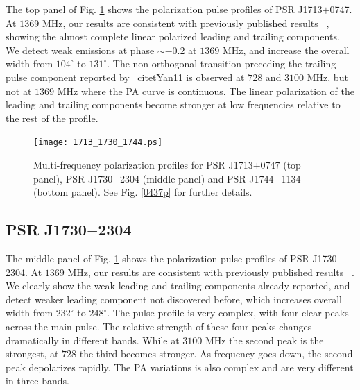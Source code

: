 \documentclass[useAMS,usenatbib]{mn2e}
\begin{document}
The top panel of Fig. \ref{1713p} shows the polarization pulse profiles of 
PSR J1713$+$0747. 
%
At $1369$ MHz, our results are consistent with previously published results
~\citep{Ord04,Yan11}, showing the almost complete linear polarized leading and 
trailing components.
%
We detect weak emissions at phase $\sim-0.2$ at $1369$ MHz, and increase the 
overall width from $104^{\circ}$ to $131^{\circ}$. 
%
The non-orthogonal transition preceding the trailing pulse component reported 
by ~citet{Yan11} is observed at $728$ and $3100$ MHz, but not at $1369$ MHz 
where the PA curve is continuous.
%
The linear polarization of the leading and trailing components become stronger 
at low frequencies relative to the rest of the profile.


\begin{figure}
\begin{center}
\texttt{[image: 1713\_1730\_1744.ps]}
\caption{Multi-frequency polarization profiles for PSR J1713$+$0747 (top 
panel), PSR J1730$-$2304 (middle panel) and PSR J1744$-$1134 (bottom panel). 
See Fig. \ref{0437p} for further details.}
\label{1713p}
\end{center}
\end{figure}

\subsection{PSR J1730$-$2304}

The middle panel of Fig. \ref{1713p} shows the polarization pulse profiles of 
PSR J1730$-$2304.
%
At $1369$ MHz, our results are consistent with previously published results
~\citep{Ord04,Yan11}. 
%
We clearly show the weak leading and trailing components already reported, 
and detect weaker leading component not discovered before, which increases 
overall width from $232^{\circ}$ to $248^{\circ}$.
%
The pulse profile is very complex, with four clear peaks across the main pulse.
%
The relative strength of these four peaks changes dramatically in different 
bands. While at $3100$ MHz the second peak is the strongest, at $728$ the third 
becomes stronger. 
%
As frequency goes down, the second peak depolarizes rapidly.
%
The PA variations is also complex and are very different in three bands.
\end{document}
